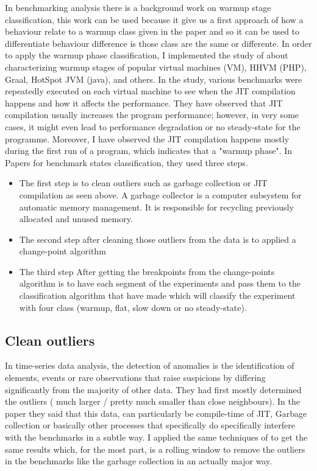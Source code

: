 \documentclass{article}
\begin{document}
In benchmarking analysis there is a background work on warmup stage classification, this work can be used because it give us a first approach of how a behaviour relate to a warmup class given in the paper and so it can be used to differentiate behaviour difference is those class are the same or differente. In order to apply the warmup phase classification, I implemented the study of \citep{barrett2017virtual} about characterizing warmup stages of popular virtual machines (VM), HHVM (PHP), Graal, HotSpot JVM (java), and others. 
In the study, various benchmarks were repeatedly executed on each virtual machine to see when the JIT compilation happens and how it affects the performance.
They have observed that JIT compilation usually increases the program performance; however, in very some cases, it might even lead to performance degradation or no steady-state for the programme. Moreover, I have observed the JIT compilation happens mostly during the first run of a program, which indicates that a "warmup phase".
In \citep{barrett2017virtual} Papers for benchmark states classification, they used three steps.

\begin{itemize}
    \item The first step is to clean outliers such as garbage collection or JIT compilation as seen above. A garbage collector is a computer subsystem for automatic memory management.  It is responsible for recycling previously allocated and unused memory.  
    \item The second step after cleaning those outliers from the data is to applied a change-point algorithm \citep{killick2014changepoint}
    \item The third step After getting the breakpoints from the change-points algorithm is to have each segment of the experiments and pass them to the classification algorithm that \citep{barrett2017virtual} have made which will classify the experiment with four class (warmup, flat, slow down or no steady-state).
\end{itemize}




\subsection{Clean outliers}

In time-series data analysis, the detection of anomalies is the identification of elements, events or rare observations that raise suspicions by differing significantly from the majority of other data. They had first mostly determined the outliers ( much larger / pretty much smaller than close neighbours). In the paper \citep{barrett2017virtual} they said that this data, can particularly be compile-time of JIT, Garbage collection or basically other processes that specifically do specifically interfere with the benchmarks in a subtle way. I applied the same techniques of \citep{barrett2017virtual} to get the same results which, for the most part, is a rolling window to remove the outliers in the benchmarks like the garbage collection in an actually major way.
\end{document}

